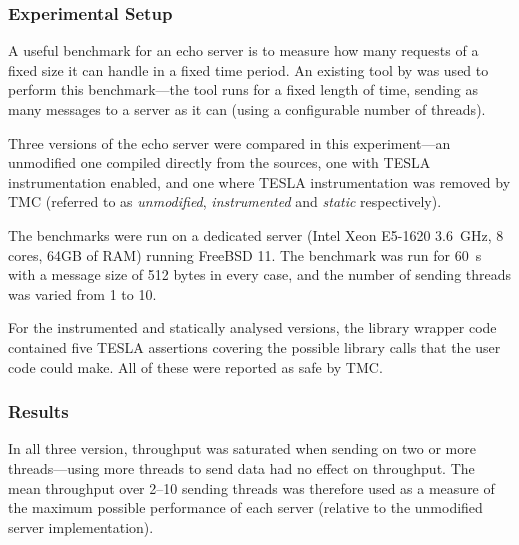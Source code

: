 \subsubsection{Experimental Setup}

A useful benchmark for an echo server is to measure how many requests of a fixed
size it can handle in a fixed time period. An existing tool by
\textcite{hoyer_rust_2016} was used to perform this benchmark---the tool runs
for a fixed length of time, sending as many messages to a server as it can
(using a configurable number of threads).

Three versions of the echo server were compared in this experiment---an
unmodified one compiled directly from the \lwip{} sources, one with TESLA
instrumentation enabled, and one where TESLA instrumentation was removed by TMC
(referred to as \emph{unmodified}, \emph{instrumented} and \emph{static}
respectively).

The benchmarks were run on a dedicated server (Intel Xeon E5-1620
\SI{3.6}{\GHz}, 8 cores, 64GB of RAM) running FreeBSD 11. The benchmark was run
for \SI{60}{\s} with a message size of 512 bytes in every case, and the number
of sending threads was varied from 1 to 10.

For the instrumented and statically analysed versions, the library wrapper code
contained five TESLA assertions covering the possible library calls that the
user code could make. All of these were reported as safe by TMC.

\subsubsection{Results}

In all three version, throughput was saturated when sending on two or more
threads---using more threads to send data had no effect on throughput. The mean
throughput over 2--10 sending threads was therefore used as a measure of the
maximum possible performance of each server (relative to the unmodified server
implementation). 

